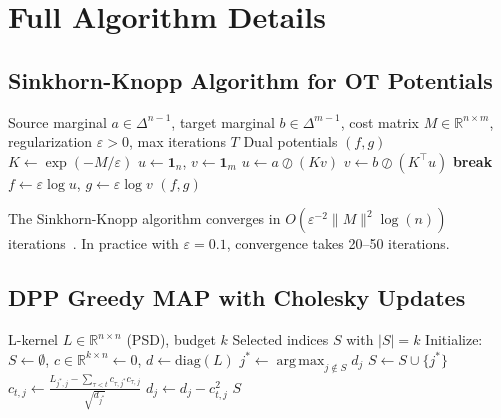 \documentclass[10pt]{article}
\DeclareMathOperator*{\argmax}{arg\,max}
\begin{document}
\appendix
\newpage

\section{Full Algorithm Details}
\label{app:algorithms}

\subsection{Sinkhorn-Knopp Algorithm for OT Potentials}

\begin{algorithm}[H]
\caption{Sinkhorn-Knopp for Entropic OT}
\label{alg:sinkhorn}
\begin{algorithmic}[1]
\REQUIRE Source marginal $a \in \Delta^{n-1}$, target marginal $b \in \Delta^{m-1}$, cost matrix $M \in \mathbb{R}^{n \times m}$, regularization $\varepsilon > 0$, max iterations $T$
\ENSURE Dual potentials $(f, g)$
\STATE $K \leftarrow \exp(-M/\varepsilon)$ 
\STATE $u \leftarrow \mathbf{1}_n$, $v \leftarrow \mathbf{1}_m$
  \STATE $u \leftarrow a \oslash (K v)$ 
  \STATE $v \leftarrow b \oslash (K^\top u)$
    \STATE \textbf{break}
  \ENDIF
\ENDFOR
\STATE $f \leftarrow \varepsilon \log u$, $g \leftarrow \varepsilon \log v$
\RETURN $(f, g)$
\end{algorithmic}
\end{algorithm}

The Sinkhorn-Knopp algorithm converges in $O(\varepsilon^{-2} \|M\|^2 \log(n))$ iterations~\citep{cuturi2013sinkhorn}. In practice with $\varepsilon = 0.1$, convergence takes 20--50 iterations.

\subsection{DPP Greedy MAP with Cholesky Updates}

\begin{algorithm}[H]
\caption{Greedy MAP Inference for DPP}
\label{alg:dpp}
\begin{algorithmic}[1]
\REQUIRE L-kernel $L \in \mathbb{R}^{n \times n}$ (PSD), budget $k$
\ENSURE Selected indices $S$ with $|S| = k$
\STATE Initialize: $S \leftarrow \emptyset$, $c \in \mathbb{R}^{k \times n} \leftarrow 0$, $d \leftarrow \text{diag}(L)$
  \STATE $j^* \leftarrow \argmax_{j \notin S} d_j$ 
  \STATE $S \leftarrow S \cup \{j^*\}$
  \STATE {}
    \STATE $c_{t,j} \leftarrow \frac{L_{j^*,j} - \sum_{\tau < t} c_{\tau,j^*} c_{\tau,j}}{\sqrt{d_{j^*}}}$
    \STATE $d_j \leftarrow d_j - c_{t,j}^2$
  \ENDFOR
\ENDFOR
\RETURN $S$
\end{algorithmic}
\end{algorithm}
\end{document}
